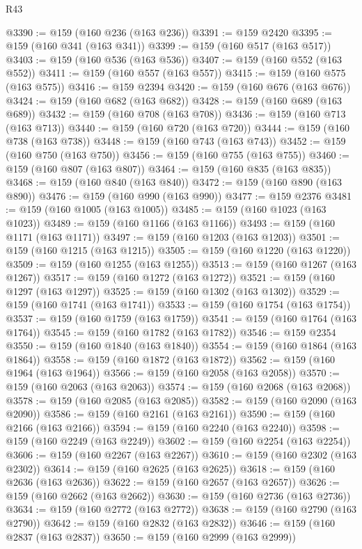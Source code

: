 \begin{lexlean}{R43}
\begin{coremodule}
@3390 := @159 (@160 @236 (@163 @236))
@3391 := @159 @2420
@3395 := @159 (@160 @341 (@163 @341))
@3399 := @159 (@160 @517 (@163 @517))
@3403 := @159 (@160 @536 (@163 @536))
@3407 := @159 (@160 @552 (@163 @552))
@3411 := @159 (@160 @557 (@163 @557))
@3415 := @159 (@160 @575 (@163 @575))
@3416 := @159 @2394
@3420 := @159 (@160 @676 (@163 @676))
@3424 := @159 (@160 @682 (@163 @682))
@3428 := @159 (@160 @689 (@163 @689))
@3432 := @159 (@160 @708 (@163 @708))
@3436 := @159 (@160 @713 (@163 @713))
@3440 := @159 (@160 @720 (@163 @720))
@3444 := @159 (@160 @738 (@163 @738))
@3448 := @159 (@160 @743 (@163 @743))
@3452 := @159 (@160 @750 (@163 @750))
@3456 := @159 (@160 @755 (@163 @755))
@3460 := @159 (@160 @807 (@163 @807))
@3464 := @159 (@160 @835 (@163 @835))
@3468 := @159 (@160 @840 (@163 @840))
@3472 := @159 (@160 @890 (@163 @890))
@3476 := @159 (@160 @990 (@163 @990))
@3477 := @159 @2376
@3481 := @159 (@160 @1005 (@163 @1005))
@3485 := @159 (@160 @1023 (@163 @1023))
@3489 := @159 (@160 @1166 (@163 @1166))
@3493 := @159 (@160 @1171 (@163 @1171))
@3497 := @159 (@160 @1203 (@163 @1203))
@3501 := @159 (@160 @1215 (@163 @1215))
@3505 := @159 (@160 @1220 (@163 @1220))
@3509 := @159 (@160 @1255 (@163 @1255))
@3513 := @159 (@160 @1267 (@163 @1267))
@3517 := @159 (@160 @1272 (@163 @1272))
@3521 := @159 (@160 @1297 (@163 @1297))
@3525 := @159 (@160 @1302 (@163 @1302))
@3529 := @159 (@160 @1741 (@163 @1741))
@3533 := @159 (@160 @1754 (@163 @1754))
@3537 := @159 (@160 @1759 (@163 @1759))
@3541 := @159 (@160 @1764 (@163 @1764))
@3545 := @159 (@160 @1782 (@163 @1782))
@3546 := @159 @2354
@3550 := @159 (@160 @1840 (@163 @1840))
@3554 := @159 (@160 @1864 (@163 @1864))
@3558 := @159 (@160 @1872 (@163 @1872))
@3562 := @159 (@160 @1964 (@163 @1964))
@3566 := @159 (@160 @2058 (@163 @2058))
@3570 := @159 (@160 @2063 (@163 @2063))
@3574 := @159 (@160 @2068 (@163 @2068))
@3578 := @159 (@160 @2085 (@163 @2085))
@3582 := @159 (@160 @2090 (@163 @2090))
@3586 := @159 (@160 @2161 (@163 @2161))
@3590 := @159 (@160 @2166 (@163 @2166))
@3594 := @159 (@160 @2240 (@163 @2240))
@3598 := @159 (@160 @2249 (@163 @2249))
@3602 := @159 (@160 @2254 (@163 @2254))
@3606 := @159 (@160 @2267 (@163 @2267))
@3610 := @159 (@160 @2302 (@163 @2302))
@3614 := @159 (@160 @2625 (@163 @2625))
@3618 := @159 (@160 @2636 (@163 @2636))
@3622 := @159 (@160 @2657 (@163 @2657))
@3626 := @159 (@160 @2662 (@163 @2662))
@3630 := @159 (@160 @2736 (@163 @2736))
@3634 := @159 (@160 @2772 (@163 @2772))
@3638 := @159 (@160 @2790 (@163 @2790))
@3642 := @159 (@160 @2832 (@163 @2832))
@3646 := @159 (@160 @2837 (@163 @2837))
@3650 := @159 (@160 @2999 (@163 @2999))

\end{coremodule}
\end{lexlean}
